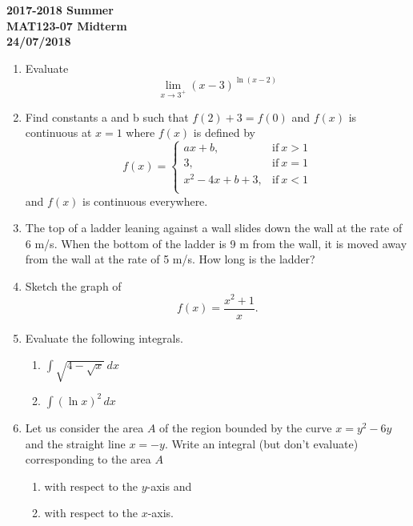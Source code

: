 \documentclass[a4paper, 12pt]{article}
\begin{document}
\pagestyle{empty}

\begin{center}
\textbf{2017-2018 Summer\\MAT123-07 Midterm\\24/07/2018}
\end{center}

\begin{enumerate}[leftmargin=*,label=\textbf{\arabic*.}]
\item Evaluate
\[\lim_{x\to3^+}(x-3)^{\ln(x-2)}\]

\item Find constants a and b such that $f(2) + 3 = f(0)$ and $f(x)$ is continuous at $x=1$ where $f(x)$ is defined by
\[
f(x) =
\begin{cases}
ax + b, & \text{if}\ x > 1 \\
3, & \text{if}\ x = 1 \\
x^2-4x+b+3, & \text{if}\ x < 1 \\
\end{cases}
\]
and $f(x)$ is continuous everywhere.

\item The top of a ladder leaning against a wall slides down the wall at the rate of 6 m/s. When the bottom of the ladder is 9 m from the wall, it is moved away from the wall at the rate of 5 m/s. How long is the ladder?

\item Sketch the graph of
\[f(x) = \frac{x^2+1}{x}.\]

\item Evaluate the following integrals.

\begin{enumerate}[leftmargin=*,label=\textbf{\alph*.}]

\item $\displaystyle \int\sqrt{4-\sqrt{x}}\, dx$

\item $\displaystyle \int(\ln x)^2\, dx$

\end{enumerate}

\item Let us consider the area $A$ of the region bounded by the curve $x=y^2-6y$ and the straight line $x=-y$. Write an integral (but don't evaluate) corresponding to the area $A$
\begin{enumerate}[leftmargin=*,label=\textbf{\alph*.}]
\item with respect to the $y$-axis and
\item with respect to the $x$-axis.
\end{enumerate}
\end{enumerate}
\end{document}
